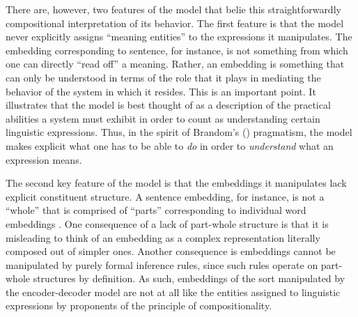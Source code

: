 There are, however, two features of the model that belie this straightforwardly compositional interpretation of its behavior. The first feature is that the model never explicitly assigns ``meaning entities'' to the expressions it manipulates. The embedding corresponding to sentence, for instance, is not something from which one can directly ``read off'' a meaning. Rather, an embedding is something that can only be understood in terms of the role that it plays in mediating the behavior of the system in which it resides. This is an important point. It illustrates that the model is best thought of as a description of the practical abilities a system must exhibit in order to count as understanding certain linguistic expressions. Thus, in the spirit of Brandom's (\citeyear{Brandom:1994,Brandom:2011}) pragmatism, the model makes explicit what one has to be able to \textit{do} in order to \textit{understand} what an expression means. 

The second key feature of the model is that the embeddings it manipulates lack explicit constituent structure. A sentence embedding, for instance, is not a ``whole'' that is comprised of ``parts'' corresponding to individual word embeddings \citep{Eliasmith:2013}. One consequence of a lack of part-whole structure is that it is misleading to think of an embedding as a complex representation literally composed out of simpler ones. Another consequence is embeddings cannot be manipulated by purely formal inference rules, since such rules operate on part-whole structures by definition. As such, embeddings of the sort manipulated by the encoder-decoder model are not at all like the entities assigned to linguistic expressions by proponents of the principle of compositionality.

